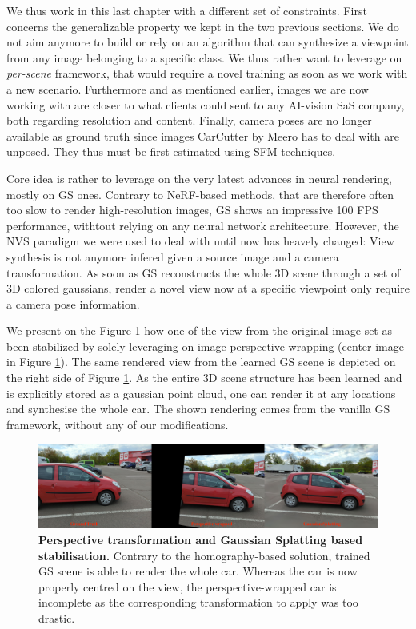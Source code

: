 We thus work in this last chapter with a different set of constraints. First concerns the generalizable property we kept in the two previous sections. We do not aim anymore to build or rely on an algorithm that can synthesize a viewpoint from any image belonging to a specific class. We thus rather want to leverage on \textit{per-scene} framework, that would require a novel training as soon as we work with a new scenario. Furthermore and as mentioned earlier, images we are now working with are closer to what clients could sent to any \ac{AI}-vision SaS company, both regarding resolution and content. Finally, camera poses are no longer available as ground truth since images CarCutter by Meero has to deal with are unposed. They thus must be first estimated using \ac{SFM} techniques.

Core idea is rather to leverage on the very latest advances in neural rendering, mostly on \ac{GS} ones. Contrary to \ac{NeRF}-based methods, that are therefore often too slow to render high-resolution images, \ac{GS} shows an impressive 100 \ac{FPS} performance, withtout relying on any neural network architecture. However, the \ac{NVS} paradigm we were used to deal with until now has heavely changed: View synthesis is not anymore infered given a source image and a camera transformation. As soon as \ac{GS} reconstructs the whole 3D scene through a set of 3D colored gaussians, render a novel view now at a specific viewpoint only require a camera pose information.

We present on the Figure \ref{fig:gs-vs-homography-view3} how one of the view from the original image set as been stabilized by solely leveraging on image perspective wrapping (center image in Figure \ref{fig:gs-vs-homography-view3}). The same rendered view from the learned \ac{GS} scene is depicted on the right side of Figure \ref{fig:gs-vs-homography-view3}. As the entire 3D scene structure has been learned and is explicitly stored as a gaussian point cloud, one can render it at any locations and synthesise the whole car. The shown rendering comes from the vanilla \ac{GS} framework, without any of our modifications.

\begin{figure}[htb!]
  \center
\includegraphics[width=\linewidth]{images/gaussiansplatting/perspective-vs-gs.png}
\caption{\textbf{Perspective transformation and Gaussian Splatting based stabilisation. } Contrary to the homography-based solution, trained GS scene is able to render the whole car. Whereas the car is now properly centred on the view, the perspective-wrapped car is incomplete as the corresponding transformation to apply was too drastic.}
\label{fig:gs-vs-homography-view3}
\end{figure}

